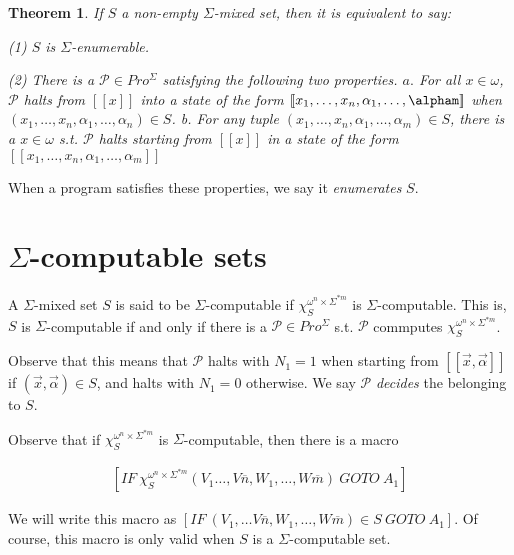 \documentclass[a4paper, 12pt]{article}
\newtheorem{theorem}{Theorem}
\newtheorem{theorem}{Theorem}
\begin{document}
\begin{theorem}
    If $S$ a non-empty $\Sigma$-mixed set, then it is equivalent to say: 

    \textit{(1)} $S$ is $\Sigma$-enumerable. 

    \textit{(2)} There is a $\mathcal{P} \in Pro^{\Sigma}$ satisfying the
    following two properties. $a.$ For all $x \in \omega$, $\mathcal{P}$ halts
    from $[\![ x ]\!]$ into a state of the form $[\![ x_1, \ldots, x_n,
    \alpha_1, \ldots, \alpham ]\!]$ when $(x_1, \ldots, x_n, \alpha_1, \ldots,
    \alpha_n) \in S$. \textit{b.} For any tuple $(x_1, \ldots, x_n, \alpha_1, \ldots, \alpha_m) \in
S$, there is a $x \in \omega$ s.t. $\mathcal{P}$ halts starting from $[\![ x
]\!]$ in a state of the form $[\![ x_1, \ldots, x_n, \alpha_1, \ldots, \alpha_m ]\!]$ 

\end{theorem}

When a program satisfies these properties, we say it \textit{enumerates} $S$.



\section{$\Sigma$-computable sets}

A $\Sigma$-mixed set $S$ is said to be $\Sigma$-computable if
$\chi_{S}^{\omega^n \times \Sigma^{*m}}$ is $\Sigma$-computable. This is, $S$ is
$\Sigma$-computable if and only if there is a $\mathcal{P} \in Pro^{\Sigma}$
s.t. $\mathcal{P}$ commputes $\chi_S^{\omega^n \times \Sigma^{*m}}$. 

Observe that this means that $\mathcal{P}$ halts with $N_1 = 1$ when starting
from $[\![ \overrightarrow{x}, \overrightarrow{\alpha} ]\!]$ if
$(\overrightarrow{x}, \overrightarrow{\alpha}) \in S$, and halts with $N_1 = 0$
otherwise. We say $\mathcal{P}$ \textit{decides} the belonging to $S$.

Observe that if $\chi_S^{\omega^n \times \Sigma^{*m}}$ is $\Sigma$-computable,
then there is a macro 

\begin{align*}
    \left[ IF ~ \chi_S^{\omega^n \times \Sigma^{*m}} \left( V_1 \ldots, V
    \overline{n}, W_1, \ldots, W \overline{m} \right) ~ GOTO ~ A_1  \right] 
\end{align*}

We will write this macro as $\left[ IF ~ (V_1, \ldots V \overline{n}, W_1, \ldots,
W \overline{m}) \in S ~ GOTO ~ A_1 \right] $. Of course, this macro is only
valid when $S$ is a $\Sigma$-computable set.
\end{document}
